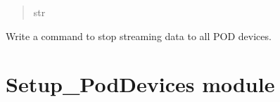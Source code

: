 \documentclass[letterpaper,10pt,english]{sphinxmanual}
\begin{document}
\begin{fulllineitems}
\begin{fulllineitems}
\begin{quote}
\begin{description}
\sphinxAtStartPar
str

\end{description}\end{quote}

\end{fulllineitems}


\begin{fulllineitems}
\label{\detokenize{Setup_8401HR:Setup_8401HR.Setup_8401HR.StopStream}}
\pysigstartsignatures
{}
\pysigstopsignatures
\sphinxAtStartPar
Write a command to stop streaming data to all POD devices.

\end{fulllineitems}


\end{fulllineitems}


\sphinxstepscope


\section{Setup\_PodDevices module}
\label{\detokenize{Setup_PodDevices:module-Setup_PodDevices}}\label{\detokenize{Setup_PodDevices:setup-poddevices-module}}\label{\detokenize{Setup_PodDevices::doc}}
\end{document}
